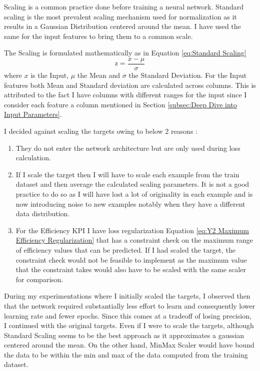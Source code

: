 \documentclass{report} %
\begin{document}
Scaling is a common practice done before training a neural network. 
Standard scaling is the most prevalent scaling mechanism used for normalization as it results in a Gaussian Distribution centered around the mean.
I have used the same for the input features to bring them to a common scale. 

The Scaling is formulated mathematically as in Equation \ref{eq:Standard Scaling}
\begin{equation}
    \text{z} = \frac{x - \mu}{\sigma}
    \label{eq:Standard Scaling}
\end{equation} 
where $x$ is the Input, $\mu$ the Mean and $\sigma$ the Standard Deviation.
For the Input features both Mean and Standard deviation are calculated across columns. 
This is attributed to the fact I have columns with different ranges for the input since I consider each feature a column mentioned in 
Section \ref{subsec:Deep Dive into Input Parameters}.

I decided against scaling the targets owing to below 2 reasons :
\begin{enumerate}[nosep]
    \item They do not enter the network architecture but are only used during loss calculation.
    \item If I scale the target then I will have to scale each example from the train dataset and then average the calculated scaling parameters.
    It is not a good practice to do so as I will have lost a lot of originality in each example and is now introducing noise to new examples notably when they have a different data distribution.
    \item For the Efficiency \ac{KPI} I have loss regularization Equation \ref{eq:Y2 Maximum Efficiency Regularization} that has a constraint 
    check on the maximum range of efficiency values that can be predicted. If I had scaled the target, the constraint check would not be feasible to 
    implement as the maximum value that the constraint takes would also have to be scaled with the same scaler for comparison.
\end{enumerate}

During my experimentations where I initially scaled the targets, I observed then that the network required substantially less effort to learn and consequently lower learning rate and fewer epochs.
Since this comes at a tradeoff of losing precision, I continued with the original targets.
Even if I were to scale the targets, although Standard Scaling seems to be the best approach as it approximates a gaussian centered around the mean.
On the other hand, MinMax Scaler would have bound the data to be within the min and max of the data computed from the training dataset.
\end{document}
